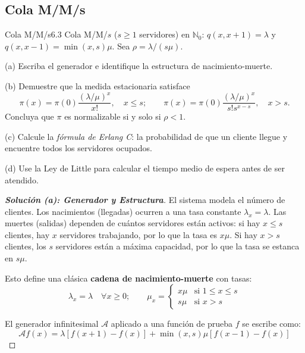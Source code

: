 \documentclass[10pt,a4paper]{article}
\begin{document}
\newpage

\subsection{Cola M/M/s}



\begin{ejercicio}{Cola M/M/s}{6.3}
    Cola M/M/$s$ ($s \ge 1$ servidores) en $\mathbb{N}_0$: $q(x, x + 1) = \lambda$ y $q(x, x - 1) = \min(x, s)\mu$. Sea $\rho = \lambda/(s\mu)$.
    
    (a) Escriba el generador e identifique la estructura de nacimiento-muerte.
    
    (b) Demuestre que la medida estacionaria satisface
    \[ \pi(x) = \pi(0) \frac{(\lambda/\mu)^x}{x!}, \quad x \le s; \qquad \pi(x) = \pi(0) \frac{(\lambda/\mu)^x}{s! s^{x-s}}, \quad x > s. \]
    Concluya que $\pi$ es normalizable si y solo si $\rho < 1$.
    
    (c) Calcule la \textit{fórmula de Erlang C}: la probabilidad de que un cliente llegue y encuentre todos los servidores ocupados.
    
    (d) Use la Ley de Little para calcular el tiempo medio de espera antes de ser atendido.
\end{ejercicio}

\vspace{2mm}

\begin{proof}[\textbf{Solución (a): Generador y Estructura}]
    El sistema modela el número de clientes. Los nacimientos (llegadas) ocurren a una tasa constante $\lambda_x = \lambda$. Las muertes (salidas) dependen de cuántos servidores están activos: si hay $x \le s$ clientes, hay $x$ servidores trabajando, por lo que la tasa es $x\mu$. Si hay $x > s$ clientes, los $s$ servidores están a máxima capacidad, por lo que la tasa se estanca en $s\mu$.
    
    Esto define una clásica \textbf{cadena de nacimiento-muerte} con tasas:
    \[ \lambda_x = \lambda \quad \forall x \ge 0; \qquad \mu_x = \begin{cases} x\mu & \text{si } 1 \le x \le s \\ s\mu & \text{si } x > s \end{cases} \]
    
    El generador infinitesimal $\mathcal{A}$ aplicado a una función de prueba $f$ se escribe como:
    \[ \mathcal{A}f(x) = \lambda[f(x+1) - f(x)] + \min(x, s)\mu [f(x-1) - f(x)] \]
\end{proof}
\end{document}
